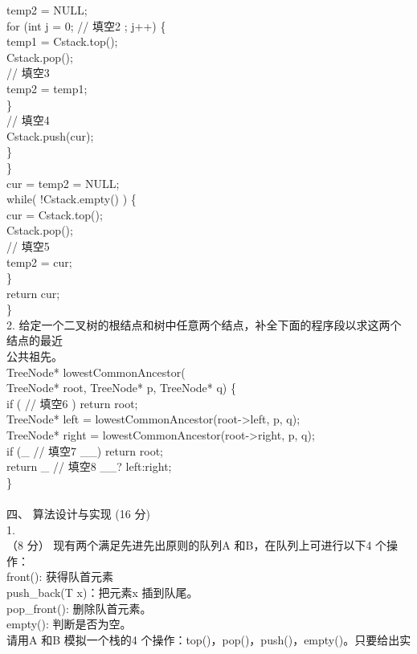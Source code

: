 \begin{question}
temp2 = NULL;\\
for (int j = 0;       // 填空2      ; j++) \{\\
temp1 = Cstack.top();\\
Cstack.pop();\\
// 填空3\\
temp2 = temp1;\\
\}\\
// 填空4\\
Cstack.push(cur);\\
\}\\
\}\\
cur = temp2 = NULL;\\
while( !Cstack.empty() ) \{\\
cur = Cstack.top();\\
Cstack.pop();\\
// 填空5\\
temp2 = cur;\\
\}\\
return cur;\\
\}\\
2. 给定一个二叉树的根结点和树中任意两个结点，补全下面的程序段以求这两个结点的最近\\
公共祖先。\\
TreeNode* lowestCommonAncestor(\\
TreeNode* root, TreeNode* p, TreeNode* q) \{\\
if (      // 填空6      ) return root;\\
TreeNode* left = lowestCommonAncestor(root->left, p, q);\\
TreeNode* right = lowestCommonAncestor(root->right, p, q);\\
if (\_      // 填空7      \_\_) return root;\\
return \_      // 填空8      \_\_? left:right;\\
\}\\
\\
四、 算法设计与实现 (16 分)\\
1.\\
（8 分） 现有两个满足先进先出原则的队列A 和B，在队列上可进行以下4 个操作：\\
front(): 获得队首元素\\
push\_back(T x)：把元素x 插到队尾。\\
pop\_front(): 删除队首元素。\\
empty(): 判断是否为空。\\
请用A 和B 模拟一个栈的4 个操作：top()，pop()，push()，empty()。只要给出实\\

\end{question}
